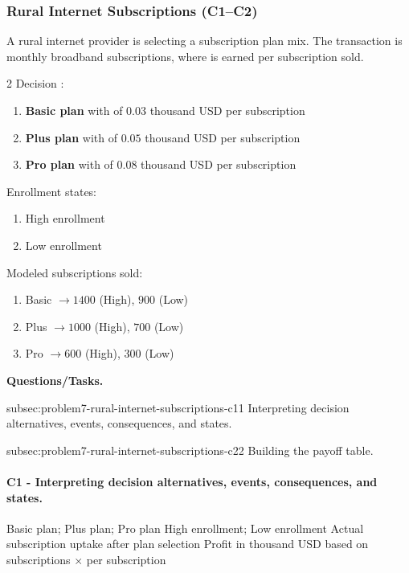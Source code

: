 	\subsubsection{Rural Internet Subscriptions (C1--C2)}
	\label{sec:problem7-rural-internet-subscriptions-c1-c2}
	A rural internet provider is selecting a subscription plan mix. The transaction is monthly broadband subscriptions, where  is earned per subscription sold.

	\begin{multicols}{2}
		Decision :
		\begin{enumerate}[label=\arabic*.]
			\item \textbf{Basic plan} with  of $0.03$ thousand USD per subscription
			\item \textbf{Plus plan} with  of $0.05$ thousand USD per subscription
			\item \textbf{Pro plan} with  of $0.08$ thousand USD per subscription
		\end{enumerate}

		Enrollment states:
		\begin{enumerate}[label=\arabic*.]
			\item High enrollment
			\item Low enrollment
		\end{enumerate}

			\columnbreak

		Modeled subscriptions sold:
		\begin{enumerate}[label=\arabic*.]
			\item Basic $\to 1400$ (High), $900$ (Low)
			\item Plus $\to 1000$ (High), $700$ (Low)
			\item Pro $\to 600$ (High), $300$ (Low)
		\end{enumerate}
	\end{multicols}

	\textbf{Questions/Tasks.}
	\begin{enumerate}
		\CriterionTask
		{subsec:problem7-rural-internet-subscriptions-c1}{1}
		{Interpreting decision alternatives, events, consequences, and states.}

		\CriterionTask
		{subsec:problem7-rural-internet-subscriptions-c2}{2}
		{Building the payoff table.}
	\end{enumerate}

	\paragraph*{C1 - Interpreting decision alternatives, events, consequences, and states.}
	\label{subsec:problem7-rural-internet-subscriptions-c1}
	\DecisionElementsTable
	{Basic plan; Plus plan; Pro plan}
	{High enrollment; Low enrollment}
	{Actual subscription uptake after plan selection}
	{Profit in thousand USD based on subscriptions $\times$  per subscription}

